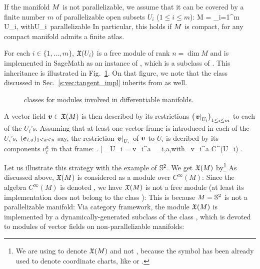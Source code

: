 If the manifold $M$ is not parallelizable,
we assume that it can be covered by a finite number $m$
of parallelizable open subsets $U_i$ ($1\leq i \leq m$):
\be
    M = \bigcup_{i=1}^m U_i, \qquad\mbox{with}\quad U_i\ \mbox{parallelizable}
\ee
In particular, this holds if $M$ is compact, for any compact
manifold admits a finite atlas.

For each $i\in\{1,\ldots,m\}$, $\mathfrak{X}(U_i)$ is a free module of rank $n=\dim  M$ and is implemented in SageMath as an instance of
, which is a subclass of
. This inheritance is illustrated in
Fig.~\ref{f:vec:module_classes}. On that figure, we note that the class
 discussed in Sec.~\ref{s:vec:tangent_impl} inherits from
 as well.

\begin{figure}
\begin{center}

\end{center}
\caption{\label{f:vec:module_classes} \footnotesize
\Sage{} classes for modules involved in differentiable manifolds.}
\end{figure}


A vector field $\bm{v}\in\mathfrak{X}(M)$ is then described by its
restrictions $\left(\left. \bm{v}\right| _{U_i}\right)_{1\leq i \leq m}$ to each of the $U_i$'s.
Assuming that at least one vector frame is introduced in each of the $U_i$'s,
$(\bm{e}_{i,a})_{1\leq a \leq n}$ say, the restriction $\left. \bm{v}\right| _{U_i}$ of
$\bm{v}$ to $U_i$ is decribed by its components $v_i^a$ in that frame:
\be \label{e:vec:vi_expand}
    \left. \right| _{U_i} = v_i^a \, _{i,a},\quad\mbox{with\ } v_i^a \in C^\infty(U_i) .
\ee

Let us illustrate this strategy with the example of $\mathbb{S}^2$.
We get $\mathfrak{X}(M)$ by\footnote{We are using  to denote $\mathfrak{X}(M)$ and not , because the symbol  has been already used to denote coordinate charts, like
 or .}
As discussed above, $\mathfrak{X}(M)$ is considered as a module over $C^\infty(M)$:
Since the algebra $C^\infty(M)$ is denoted , we have
$\mathfrak{X}(M)$ is not a free module (at least its \Sage{} implementation does not
belong to the class ):
This is because $M=\mathbb{S}^2$ is not a parallelizable manifold:
Via \Sage{} category framework,
the module $\mathfrak{X}(M)$ is implemented by a dynamically-generated subclass
of the class , which is devoted to modules of vector fields
on non-parallelizable manifolds:

